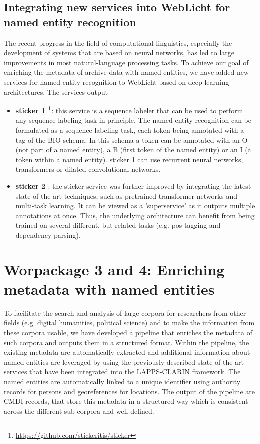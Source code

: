 \documentclass{article}
\begin{document}
\subsection{Integrating new services into WebLicht for named entity recognition}
The recent progress in the field of computational linguistics, especially the development of systems that are based on neural networks, has led to large improvements in most natural-language processing tasks. To achieve our goal of enriching the metadata of archive data with named entities, we have added new services for named entity recognition to WebLicht based on deep learning architectures. The services output 
\begin{itemize}
    \item \textbf{sticker 1 \footnote{\hyperlink{https://github.com/stickeritis/sticker}{https://github.com/stickeritis/sticker}}}: this service is a sequence labeler that can be used to perform any sequence labeling task in principle. The named entity recognition can be formulated as a sequence labeling task, each token being annotated with a tag of the BIO schema. In this schema a token can be annotated with an O (not part of a named entity), a B (first token of the named entity) or an I (a token within a named entity). sticker 1 can use recurrent neural networks, transformers or dilated convolutional networks.
    \item \textbf{sticker 2 \parencite{sticker2}}: the sticker service was further improved by integrating the latest state-of the art techniques, such as pretrained transformer networks \parencite{xmlroberta} and multi-task learning. It can be viewed as a 'superservice' as it outputs multiple annotations at once. Thus, the underlying architecture can benefit from being trained on several different, but related tasks (e.g. pos-tagging and dependency parsing). 
\end{itemize}

\section{Worpackage 3 and 4: Enriching metadata with named entities}

To facilitate the search and analysis of large corpora for researchers from other fields (e.g. digital humanities, political science) and to make the information from these corpora usable, we have developed a pipeline that enriches the metadata of such corpora and outputs them in a structured format. 
Within the pipeline, the existing metadata are automatically extracted and additional information about named entities are leveraged by using the previously described state-of-the art services that have been integrated into the LAPPS-CLARIN framework. The named entities are automatically linked to a unique identifier using authority records for persons and georeferences for locations. The output of the pipeline are CMDI records, that store this metadata in a structured way which is consistent across the different sub corpora and well defined. 
\end{document}
